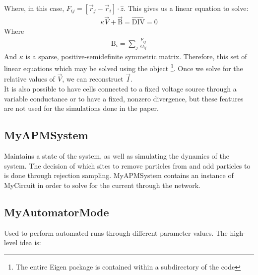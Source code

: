 \documentclass[rspublic, aps, superscriptaddress,preprintnumbers, showpacs, notitlepage]{revtex4-1}
\newcommand{\bracket}[1]{{\left [ #1 \right ]}}
\newcommand{\myequationn}[1]{\begin{align*} #1 \end{align*}}
\def \resist{\ensuremath{\Omega} \xspace}
\def \curr{\ensuremath{I} \xspace}
\def \conduct{\ensuremath{\kappa} \xspace}
\def \curr{\ensuremath{I} \xspace}
\def \posit{\ensuremath{\vec{r}} \xspace}
\def \div{\ensuremath{\text{DIV}} \xspace}
\def \basediv{\ensuremath{\text{B}} \xspace}
\def \voltage{\ensuremath{V}}
\def \driv{\ensuremath{F}}
\begin{document}
Where, in this case, $\driv_{ij} = \bracket{\posit_{j} - \posit_{i}} \cdot \hat{z}$. This gives us a linear equation to solve:
\myequationn{
\conduct \vec{V} + \vec{\basediv} = \vec{\div} = 0
}
%
Where 
\myequationn{
\basediv_{i} = \sum_{j}  \frac{\driv_{ij}}{\resist_{ij}}
}
%
And $\conduct$ is a sparse, positive-semidefinite symmetric matrix. Therefore, this set of linear equations which may be solved using the   object \footnote{The entire Eigen package is contained within a subdirectory of the code}. Once we solve for the relative values of $\vec{\voltage}$, we can reconstruct $\vec{\curr}$. \\
%


It is also possible to have cells connected to a fixed voltage source through a variable conductance or to have a fixed, nonzero divergence, but these features are not used for the simulations done in the paper. 

\subsection{MyAPMSystem}

Maintains a state of the system, as well as simulating the dynamics of the system. The decision of which sites to remove particles from and add particles to is done through rejection sampling. MyAPMSystem contains an instance of MyCircuit in order to solve for the current through the network. 

\subsection{MyAutomatorMode}

Used to perform automated runs through different parameter values. The high-level idea is:
\end{document}
